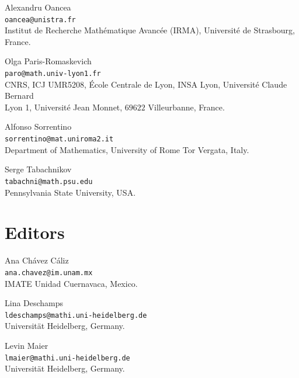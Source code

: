 \documentclass[11pt]{article}
\theoremstyle{definition}
\begin{document}
Alexandru Oancea\\
\texttt{oancea@unistra.fr} \\
Institut de Recherche Mathématique Avancée (IRMA), Université de Strasbourg, France.
\bigskip 

Olga Paris-Romaskevich\\
\texttt{paro@math.univ-lyon1.fr} \\
CNRS, ICJ UMR5208, École Centrale de Lyon, INSA Lyon, Université Claude Bernard \\
Lyon 1, Université Jean Monnet, $69622$ Villeurbanne, France.
\bigskip 

Alfonso Sorrentino\\
\texttt{sorrentino@mat.uniroma2.it} \\
Department of Mathematics, University of Rome Tor Vergata, Italy.
\bigskip

Serge Tabachnikov\\
\texttt{tabachni@math.psu.edu} \\
Pennsylvania State University, USA.

\section{Editors}

Ana Chávez Cáliz\\
\texttt{ana.chavez@im.unam.mx} \\
IMATE Unidad Cuernavaca, Mexico.
\bigskip

Lina Deschamps\\
\texttt{ldeschamps@mathi.uni-heidelberg.de} \\
Universität Heidelberg, Germany.
\bigskip

Levin Maier\\
\texttt{lmaier@mathi.uni-heidelberg.de} \\
Universität Heidelberg, Germany.
 
\end{document}
